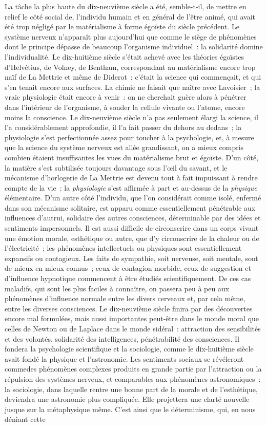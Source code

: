 \documentclass[french,twoside]{book} %
\begin{document}
\noindent La tâche la plus haute du dix-neuvième siècle a été, semble-t-il, de mettre en relief le côté social de, l’individu humain et en général de l’être animé, qui avait été trop négligé par le matérialisme à forme égoïste du siècle précédent. Le système nerveux n’apparaît plus aujourd’hui que comme le siège de phénomènes dont le principe dépasse de beaucoup l’organisme individuel : la solidarité domine l’individualité. Le dix-huitième siècle s’était achevé avec les théories égoïstes d’Helvétius, de Volney, de Bentham, correspondant au matérialisme encore trop naïf de La Mettrie et même de Diderot : c’était la science qui commençait, et qui s’en tenait encore aux surfaces. La chimie ne faisait que naître avec Lavoisier ; la vraie physiologie était encore à venir : on ne cherchait guère alors à pénétrer dans l’intérieur de l’organisme, à sonder la cellule vivante ou l’atome, encore moins la conscience. Le dix-neuvième siècle n’a pas seulement élargi la science, il l’a considérablement approfondie, il l’a fait passer du dehors au dedans ; la physiologie s’est perfectionnée assez pour toucher à la psychologie, et, à mesure que la science du système nerveux est allée grandissant, on a mieux compris combien étaient insuffisantes les vues du matérialisme brut et égoïste. D’un côté, la matière s’est subtilisée toujours davantage sous l’œil du savant, et le mécanisme d’horlogerie de La Mettrie est devenu tout à fait impuissant à rendre compte de la vie : la \emph{physiologie} s’est affirmée à part et au-dessus de la \emph{physique} élémentaire. D’un autre côté l’individu, que l’on considérait comme isolé, enfermé dans son mécanisme solitaire, est apparu comme essentiellement pénétrable aux influences d’autrui, solidaire des autres consciences, déterminable par des idées et sentiments impersonnels. Il est aussi difficile de circonscrire dans un corps vivant une émotion morale, esthétique ou autre, que d’y circonscrire de la chaleur ou de l’électricité ; les phénomènes intellectuels ou physiques sont essentiellement expansifs ou contagieux. Les faits de sympathie, soit nerveuse, soit mentale, sont de mieux en mieux connus ; ceux de contagion morbide, ceux de suggestion et d’influence hypnotique commencent à être étudiés scientifiquement. De ces cas maladifs, qui sont les plus faciles à connaître, on passera peu à peu aux phénomènes d’influence normale entre les divers cerveaux et, par cela même, entre les diverses consciences. Le dix-neuvième siècle finira par des découvertes encore mal formulées, mais aussi importantes peut-être dans le monde moral que celles de Newton ou de Laplace dans le monde sidéral : attraction des sensibilités et des volontés, solidarité des intelligences, pénétrabilité des consciences. Il fondera la psychologie scientifique et la sociologie, comme le dix-huitième siècle avait fondé la physique et l’astronomie. Les sentiments sociaux se révéleront commedes phénomènes complexes produits en grande partie par l’attraction ou la répulsion des systèmes nerveux, et comparables aux phénomènes astronomiques : la sociologie, dans laquelle rentre une bonne part de la morale et de l’esthétique, deviendra une astronomie plus compliquée. Elle projettera une clarté nouvelle jusque sur la métaphysique même. C’est ainsi que le déterminisme, qui, en nous déniant cette 
\end{document}
